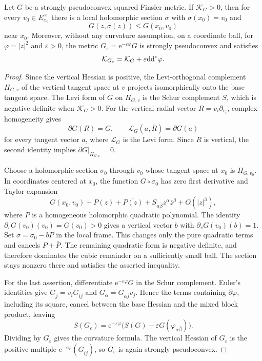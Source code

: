 \begin{lemma}\label{lem:polar-finsler-osculating-section}
Let $G$ be a strongly pseudoconvex squared Finsler metric. If $\mathcal K_G>0$, then for every $v_0\in E_{x_0}^\times$ there is a local holomorphic section $\sigma$ with $\sigma(x_0)=v_0$ and
\[
 G(z,\sigma(z))\leq G(x_0,v_0)
\]
near $x_0$. Moreover, without any curvature assumption, on a coordinate ball, for $\varphi=|z|^2$ and $\varepsilon>0$, the metric $G_\varepsilon=\mathrm e^{-\varepsilon\varphi}G$ is strongly pseudoconvex and satisfies
\[
 \mathcal K_{G_\varepsilon}=\mathcal K_G+\varepsilon\mathrm{dd}^{\mathrm{c}}\varphi.
\]
\end{lemma}
\begin{proof}
Since the vertical Hessian is positive, the Levi-orthogonal complement $H_{G,v}$ of the vertical tangent space at $v$ projects isomorphically onto the base tangent space. The Levi form of $G$ on $H_{G,v}$ is the Schur complement $S$, which is negative definite when $\mathcal K_G>0$. For the vertical radial vector $R=v_i\partial_{v_i}$, complex homogeneity gives
\[
 \partial G(R)=G,\qquad
 \mathcal L_G(a,\bar R)=\partial G(a)
\]
for every tangent vector $a$, where $\mathcal L_G$ is the Levi form. Since $R$ is vertical, the second identity implies $\partial G|_{H_{G,v}}=0$.

Choose a holomorphic section $\sigma_0$ through $v_0$ whose tangent space at $x_0$ is $H_{G,v_0}$. In coordinates centered at $x_0$, the function $G\circ\sigma_0$ has zero first derivative and Taylor expansion
\[
 G(x_0,v_0)+P(z)+\overline{P(z)}
 +S_{\alpha\bar\beta}z^\alpha\bar z^\beta+O(|z|^3),
\]
where $P$ is a homogeneous holomorphic quadratic polynomial. The identity $\partial_vG(v_0)(v_0)=G(v_0)>0$ gives a vertical vector $b$ with $\partial_vG(v_0)(b)=1$. Set $\sigma=\sigma_0-bP$ in the local frame. This changes only the pure quadratic terms and cancels $P+\bar P$. The remaining quadratic form is negative definite, and therefore dominates the cubic remainder on a sufficiently small ball. The section stays nonzero there and satisfies the asserted inequality.

For the last assertion, differentiate $\mathrm e^{-\varepsilon\varphi}G$ in the Schur complement. Euler's identities give $G_{\bar j}=v_iG_{i\bar j}$ and $G_\alpha=G_{\alpha\bar j}\bar v_j$. Hence the terms containing $\partial\varphi$, including its square, cancel between the base Hessian and the mixed block product, leaving
\[
 S(G_\varepsilon)=\mathrm e^{-\varepsilon\varphi}
       \bigl(S(G)-\varepsilon G(\varphi_{\alpha\bar\beta})\bigr).
\]
Dividing by $G_\varepsilon$ gives the curvature formula. The vertical Hessian of $G_\varepsilon$ is the positive multiple $\mathrm e^{-\varepsilon\varphi}(G_{i\bar j})$, so $G_\varepsilon$ is again strongly pseudoconvex.
\end{proof}

